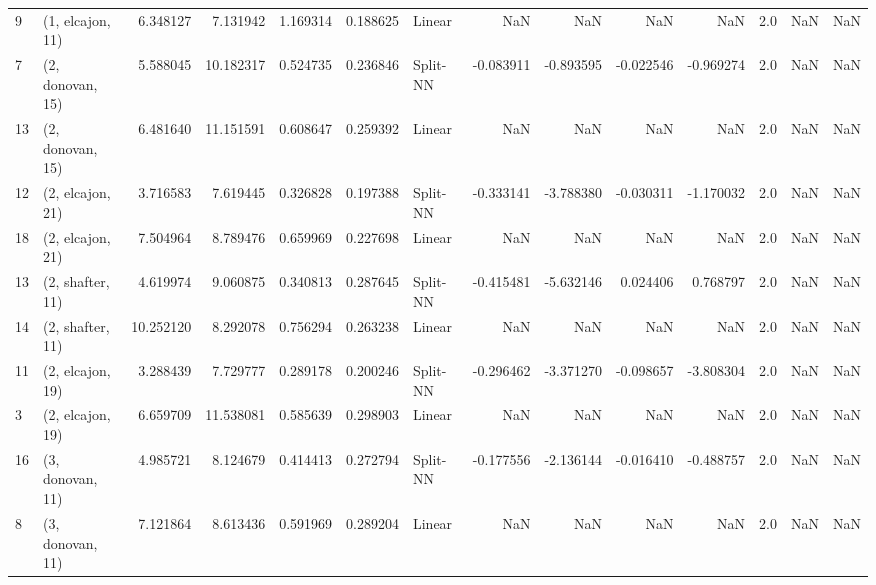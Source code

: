 \begin{tabular}{llrrrrlrrrrrrl}
9  &  (1, elcajon, 11) &   6.348127 &   7.131942 &   1.169314 &  0.188625 &      Linear &             NaN &           NaN &            NaN &          NaN &            2.0 &    NaN &              NaN \\
7  &  (2, donovan, 15) &   5.588045 &  10.182317 &   0.524735 &  0.236846 &    Split-NN &       -0.083911 &     -0.893595 &      -0.022546 &    -0.969274 &            2.0 &    NaN &              NaN \\
13 &  (2, donovan, 15) &   6.481640 &  11.151591 &   0.608647 &  0.259392 &      Linear &             NaN &           NaN &            NaN &          NaN &            2.0 &    NaN &              NaN \\
12 &  (2, elcajon, 21) &   3.716583 &   7.619445 &   0.326828 &  0.197388 &    Split-NN &       -0.333141 &     -3.788380 &      -0.030311 &    -1.170032 &            2.0 &    NaN &              NaN \\
18 &  (2, elcajon, 21) &   7.504964 &   8.789476 &   0.659969 &  0.227698 &      Linear &             NaN &           NaN &            NaN &          NaN &            2.0 &    NaN &              NaN \\
13 &  (2, shafter, 11) &   4.619974 &   9.060875 &   0.340813 &  0.287645 &    Split-NN &       -0.415481 &     -5.632146 &       0.024406 &     0.768797 &            2.0 &    NaN &              NaN \\
14 &  (2, shafter, 11) &  10.252120 &   8.292078 &   0.756294 &  0.263238 &      Linear &             NaN &           NaN &            NaN &          NaN &            2.0 &    NaN &              NaN \\
11 &  (2, elcajon, 19) &   3.288439 &   7.729777 &   0.289178 &  0.200246 &    Split-NN &       -0.296462 &     -3.371270 &      -0.098657 &    -3.808304 &            2.0 &    NaN &              NaN \\
3  &  (2, elcajon, 19) &   6.659709 &  11.538081 &   0.585639 &  0.298903 &      Linear &             NaN &           NaN &            NaN &          NaN &            2.0 &    NaN &              NaN \\
16 &  (3, donovan, 11) &   4.985721 &   8.124679 &   0.414413 &  0.272794 &    Split-NN &       -0.177556 &     -2.136144 &      -0.016410 &    -0.488757 &            2.0 &    NaN &              NaN \\
8  &  (3, donovan, 11) &   7.121864 &   8.613436 &   0.591969 &  0.289204 &      Linear &             NaN &           NaN &            NaN &          NaN &            2.0 &    NaN &              NaN \\

\end{tabular}
